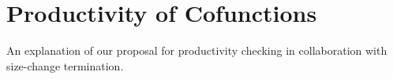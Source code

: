 \section{Productivity of Cofunctions}
\label{sec:productivity}
An explanation of our proposal for productivity checking in collaboration with size-change termination.
